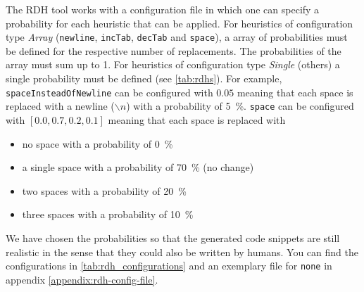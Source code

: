 \documentclass[%
class=scrreprt,
chapterprefix=false,%
open=right,%
twoside=false,%
paper=a4,%
logofile={Logo\_zentral\_farbig\_EN.png},%
thesistype=master,%
UKenglish,%
]{se2thesis}
\theoremstyle{definition}
\begin{document}
	The RDH tool works with a configuration file in which one can specify a probability for each heuristic that can be applied.
	For heuristics of configuration type \textit{Array} (\texttt{newline}, \texttt{incTab}, \texttt{decTab} and \texttt{space}), a array of probabilities must be defined for the respective number of replacements. The probabilities of the array must sum up to 1.
	For heuristics of configuration type \textit{Single} (others) a single probability must be defined (see \autoref{tab:rdhs}).
	For example, \texttt{spaceInsteadOfNewline} can be configured with $0.05$ meaning that each space is replaced with a newline ($\backslash n$) with a probability of 5~\%.
	\texttt{space} can be configured with $[0.0, 0.7, 0.2, 0.1]$ meaning that each space is replaced with
	\begin{itemize}
		\item no space with a probability of 0~\%
		\item a single space with a probability of 70~\% (no change)
		\item two spaces with a probability of 20~\%
		\item three spaces with a probability of 10~\% 
	\end{itemize}
		
	We have chosen the probabilities so that the generated code snippets are still realistic in the sense that they could also be written by humans. You can find the configurations in \autoref{tab:rdh_configurations} and an exemplary file for \texttt{none} in appendix \ref{appendix:rdh-config-file}.
	
\end{document}
